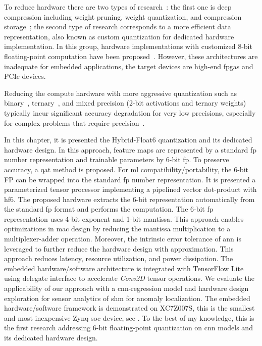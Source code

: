 To reduce hardware there are two types of research~\cite{wu2021low}: the first one is deep compression including weight pruning, weight quantization, and compression storage~\cite{han2015deep,han2015learning}; the second type of research corresponds to a more efficient data representation, also known as custom quantization for dedicated hardware implementation. In this group, hardware implementations with customized 8-bit floating-point computation have been proposed~\cite{mei2017200mhz, wu2021low, lian2019high}. However, these architectures are inadequate for embedded applications, the target devices are high-end \glspl{fpga} and PCIe devices.

Reducing the compute hardware with more aggressive quantization such as binary~\cite{courbariaux2015binaryconnect}, ternary~\cite{lin2015neural}, and mixed precision (2-bit activations and ternary weights)~\cite{colangelo2018exploration} typically incur significant accuracy degradation for very low precisions, especially for complex problems that require precision~\cite{faraone2019addnet}.

In this chapter, it is presented the Hybrid-Float6 quantization and its dedicated hardware design. In this approach, feature maps are represented by a standard \gls{fp} number representation and trainable parameters by 6-bit \gls{fp}. To preserve accuracy, a \gls{qat} method is proposed. For \gls{ml} compatibility/portability, the 6-bit FP can be wrapped into the standard \gls{fp} number representation. It is presented a parameterized tensor processor implementing a pipelined vector dot-product with \gls{hf6}. The proposed hardware extracts the 6-bit representation automatically from the standard \gls{fp} format and performs the computation. The 6-bit \gls{fp} representation uses 4-bit exponent and 1-bit mantissa. This approach enables optimizations in \gls{mac} design by reducing the mantissa multiplication to a multiplexer-adder operation. Moreover, the intrinsic error tolerance of \gls{ann} is leveraged to further reduce the hardware design with approximation. This approach reduces latency, resource utilization, and power dissipation. The embedded hardware/software architecture is integrated with TensorFlow Lite using delegate interface to accelerate \emph{Conv2D} tensor operations. We evaluate the applicability of our approach with a \gls{cnn}-regression model and hardware design exploration for sensor analytics of \gls{shm} for anomaly localization. The embedded hardware/software framework is demonstrated on XC7Z007S, this is the smallest and most inexpensive Zynq \gls{soc} device, see . To the best of my knowledge, this is the first research addressing 6-bit floating-point quantization on \gls{cnn} models and its dedicated hardware design.

